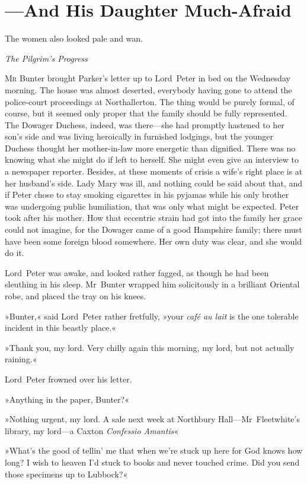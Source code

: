
\chapter{—And His Daughter Much-Afraid}

\epigraph{The women also looked pale and wan.}{\textit{The Pilgrim's Progress}}


\lettrine[lines=4]{M}{r} Bunter brought Parker's letter up to Lord~Peter in bed on the Wednesday morning. The house was almost deserted, everybody having gone to attend the police-court proceedings at Northallerton. The thing would be purely formal, of course, but it seemed only proper that the family should be fully represented. The Dowager Duchess, indeed, was there—she had promptly hastened to her son's side and was living heroically in furnished lodgings, but the younger Duchess thought her mother-in-law more energetic than dignified. There was no knowing what she might do if left to herself. She might even give an interview to a newspaper reporter. Besides, at these moments of crisis a wife's right place is at her husband's side. Lady Mary was ill, and nothing could be said about that, and if Peter chose to stay smoking cigarettes in his pyjamas while his only brother was undergoing public humiliation, that was only what might be expected. Peter took after his mother. How that eccentric strain had got into the family her grace could not imagine, for the Dowager came of a good Hampshire family; there must have been some foreign blood somewhere. Her own duty was clear, and she would do it.

Lord~Peter was awake, and looked rather fagged, as though he had been sleuthing in his sleep. Mr~Bunter wrapped him solicitously in a brilliant Oriental robe, and placed the tray on his knees.

»Bunter,« said Lord~Peter rather fretfully, »your \textit{café au lait} is the one tolerable incident in this beastly place.«

»Thank you, my lord. Very chilly again this morning, my lord, but not actually raining.«

Lord~Peter frowned over his letter.

»Anything in the paper, Bunter?«

»Nothing urgent, my lord. A sale next week at Northbury Hall—Mr~Fleetwhite's library, my lord—a Caxton \textit{Confessio Amantis}\longdash«

»What's the good of tellin' me that when we're stuck up here for God knows how long? I wish to heaven I'd stuck to books and never touched crime. Did you send those specimens up to Lubbock?«

